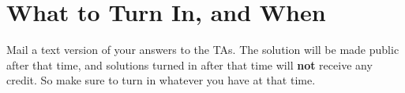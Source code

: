 \section{What to Turn In, and When}

Mail a text version of your answers to the TAs.  The solution will be
made public after that time,  and solutions turned  in after that time
will {\bf not} receive any credit.   So make sure to  turn in whatever
you have at that time.



